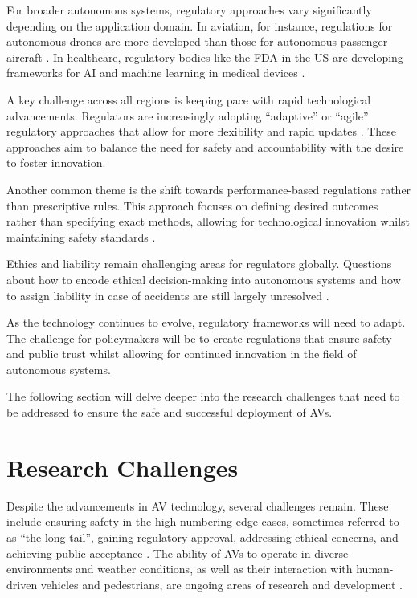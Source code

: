 For broader autonomous systems, regulatory approaches vary significantly depending on the application domain. In aviation, for instance, regulations for autonomous drones are more developed than those for autonomous passenger aircraft \cite{Hodgkinson2018}. In healthcare, regulatory bodies like the FDA in the US are developing frameworks for AI and machine learning in medical devices \cite{FDA2021}.

A key challenge across all regions is keeping pace with rapid technological advancements. Regulators are increasingly adopting ``adaptive'' or ``agile'' regulatory approaches that allow for more flexibility and rapid updates \cite{Eggers2019}. These approaches aim to balance the need for safety and accountability with the desire to foster innovation.

Another common theme is the shift towards performance-based regulations rather than prescriptive rules. This approach focuses on defining desired outcomes rather than specifying exact methods, allowing for technological innovation whilst maintaining safety standards \cite{Cihon2019}.

Ethics and liability remain challenging areas for regulators globally. Questions about how to encode ethical decision-making into autonomous systems and how to assign liability in case of accidents are still largely unresolved \cite{Awad2018}.

As the technology continues to evolve, regulatory frameworks will need to adapt. The challenge for policymakers will be to create regulations that ensure safety and public trust whilst allowing for continued innovation in the field of autonomous systems.

The following section will delve deeper into the research challenges that need to be addressed to ensure the safe and successful deployment of AVs.

\section{Research Challenges}

Despite the advancements in AV technology, several challenges remain. These include ensuring safety in the high-numbering edge cases, sometimes referred to as ``the long tail'', gaining regulatory approval, addressing ethical concerns, and achieving public acceptance \cite{Koopman2019}. The ability of AVs to operate in diverse environments and weather conditions, as well as their interaction with human-driven vehicles and pedestrians, are ongoing areas of research and development \cite{Yurtsever2020}.

